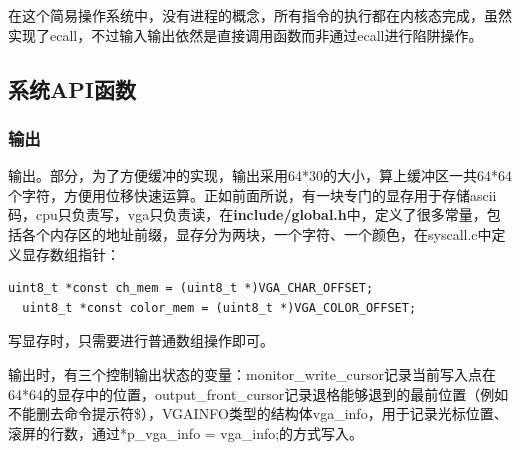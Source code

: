 \documentclass[]{article}
\begin{document}
  在这个简易操作系统中，没有进程的概念，所有指令的执行都在内核态完成，虽然实现了ecall，不过输入输出依然是直接调用函数而非通过ecall进行陷阱操作。
  \subsection{系统API函数}
  \subsubsection{输出}
  输出。部分，为了方便缓冲的实现，输出采用64*30的大小，算上缓冲区一共64*64个字符，方便用位移快速运算。正如前面所说，有一块专门的显存用于存储ascii码，cpu只负责写，vga只负责读，在\textbf{include/global.h}中，定义了很多常量，包括各个内存区的地址前缀，显存分为两块，一个字符、一个颜色，在syscall.c中定义显存数组指针：
  \begin{lstlisting}[style={c-style}]
  uint8_t *const ch_mem = (uint8_t *)VGA_CHAR_OFFSET;
  uint8_t *const color_mem = (uint8_t *)VGA_COLOR_OFFSET;  
  \end{lstlisting}
  写显存时，只需要进行普通数组操作即可。
  
  输出时，有三个控制输出状态的变量：monitor\_write\_cursor记录当前写入点在64*64的显存中的位置，output\_front\_cursor记录退格能够退到的最前位置（例如不能删去命令提示符\$），VGAINFO类型的结构体vga\_info，用于记录光标位置、滚屏的行数，通过*p\_vga\_info = vga\_info;的方式写入。
  
\end{document}
